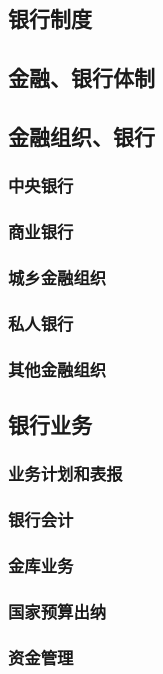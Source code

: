 \documentclass[UTF8]{../../RepresentationUniverse}
\begin{document}
    \subsection{银行制度}
    \subsection{金融、银行体制}
    \subsection{金融组织、银行}
        \subsubsection{中央银行}
        \subsubsection{商业银行}
        \subsubsection{城乡金融组织}
        \subsubsection{私人银行}
        \subsubsection{其他金融组织}
    \subsection{银行业务}
        \subsubsection{业务计划和表报}
        \subsubsection{银行会计}
        \subsubsection{金库业务}
        \subsubsection{国家预算出纳}
        \subsubsection{资金管理}
\end{document}
